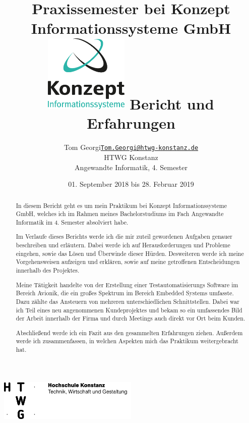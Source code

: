 \documentclass[xcolor=dvipsnames,11pt,paper=a4paper]{report}
\title{
	\Huge\textbf{Praxissemester bei Konzept Informationssysteme GmbH}\\\vspace{20pt}
	\includegraphics[width=0.3\textwidth]{graphics/konzept_logo.jpg}\break
	\huge{Bericht und Erfahrungen}
}
\author{
	\begin{tabular}{l l}
	Tom Georgi &
	\href{mailto:Tom.Georgi@htwg-konstanz.de}{\texttt{Tom.Georgi@htwg-konstanz.de}}\\
	&HTWG Konstanz\\
	&Angewandte Informatik, 4. Semester
	\end{tabular}
}
\date{01. September 2018 bis 28. Februar 2019}
\begin{document}

\begin{titlepage}
\begin{center}
\includegraphics[width=0.5\textwidth]{graphics/htwg.png}	
\end{center}
{\let\newpage\relax\maketitle}
\end{titlepage}


\begin{abstract}
In diesem Bericht geht es um mein Praktikum bei Konzept 
Informationssysteme GmbH,
welches ich im Rahmen meines Bachelorstudiums im Fach Angewandte 
Informatik im 4. Semester
absolviert habe.

Im Verlaufe dieses Berichts werde ich die mir zuteil gewordenen Aufgaben 
genauer beschreiben und erläutern. Dabei werde ich auf Herausforderungen 
und Probleme eingehen, sowie das Lösen und Überwinde dieser Hürden. 
Desweiteren werde ich meine Vorgehensweisen aufzeigen und erklären, sowie 
auf meine getroffenen Entscheidungen innerhalb des Projektes.


Meine Tätigkeit handelte von der Erstellung einer Testautomatisierungs 
Software im Bereich Avionik, die ein großes Spektrum im Bereich Embedded 
Systems umfasste. Dazu zählte das Ansteuern von mehreren 
unterschiedlichen Schnittstellen. Dabei war ich Teil eines neu 
angenommenen Kundeprojektes und bekam so ein umfassendes Bild der Arbeit 
innerhalb der Firma und durch Meetings auch direkt vor Ort beim Kunden.

Abschließend werde ich ein Fazit aus den gesammelten Erfahrungen ziehen.
Außerdem werde ich zusammenfassen, in welchen Aspekten mich das Praktikum 
weitergebracht hat.


\end{abstract}
\tableofcontents
\pagebreak

\begingroup
\let\clearpage\relax
\lstlistoflistings
\listoffigures
\listoftables
\pagebreak
\printbibliography
\endgroup
\end{document}
